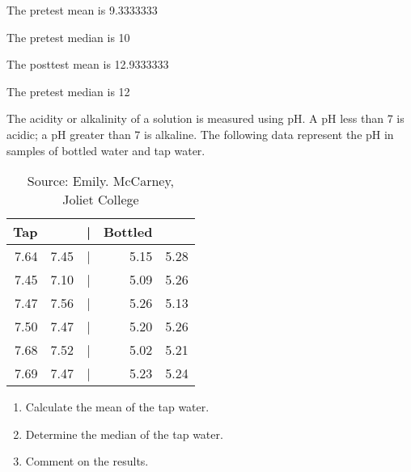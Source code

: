 \documentclass[11pt]{book}\usepackage[]{graphicx}\usepackage[]{color}
\begin{document}
\begin{exercises}
\begin{solution}
	The pretest mean is  9.3333333


	The pretest median is 10


	The posttest mean is	12.9333333


The pretest median is 12

	\end{solution}

	\begin{exercise}   %

	The acidity or alkalinity of a solution is measured using pH.  A pH less than 7 is acidic; a pH greater than 7 is alkaline.  The following data represent the pH in samples of bottled water and tap water.

\begin{table}[ht]
 \centering

	{\small{             %
	\caption{Source: Emily. McCarney, \\ Joliet College}
 \begin{tabular}{@{} rrcrr @{}}
   Tap &  & | & Bottled  & \\ \hline
   7.64 & 7.45 & | & 5.15 & 5.28 \\
   7.45 & 7.10 & | & 5.09 & 5.26 \\
   7.47 & 7.56 & | & 5.26 & 5.13 \\
   7.50 & 7.47 & | & 5.20 & 5.26 \\
   7.68 & 7.52 & | & 5.02 & 5.21 \\
   7.69 & 7.47 & | & 5.23 & 5.24 \\
    \hline
 \end{tabular}
 }}
   \label{tab:t3_15}
 \end{table}

\begin{enumerate}
 \item Calculate the mean  of the tap water.
 \item Determine the median of the tap water.
 \item Comment on the results.
\end{enumerate}
  \end{exercise}
%
%

\begin{exercise}  %


\end{exercise}
\end{exercises}
\end{document}
